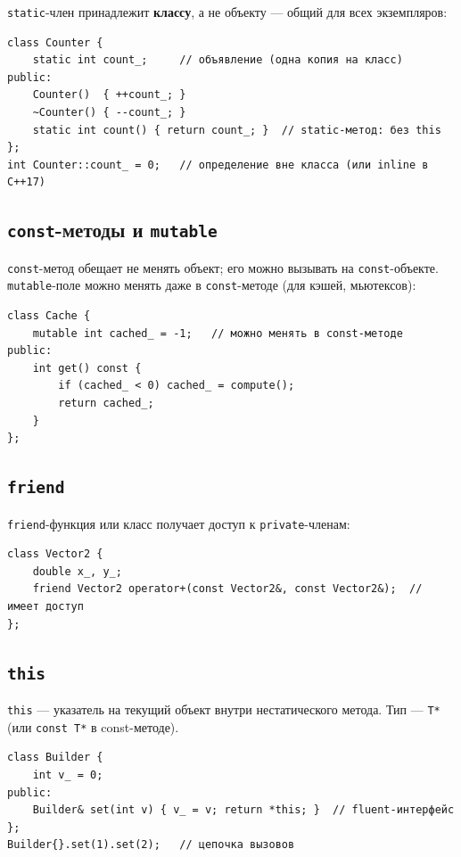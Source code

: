 \texttt{static}-член принадлежит \textbf{классу}, а не объекту --- общий для всех
экземпляров:

\begin{lstlisting}
class Counter {
    static int count_;     // объявление (одна копия на класс)
public:
    Counter()  { ++count_; }
    ~Counter() { --count_; }
    static int count() { return count_; }  // static-метод: без this
};
int Counter::count_ = 0;   // определение вне класса (или inline в C++17)
\end{lstlisting}

\subsection{\texttt{const}-методы и \texttt{mutable}}

\texttt{const}-метод обещает не менять объект; его можно вызывать на
\texttt{const}-объекте. \texttt{mutable}-поле можно менять даже в
\texttt{const}-методе (для кэшей, мьютексов):

\begin{lstlisting}
class Cache {
    mutable int cached_ = -1;   // можно менять в const-методе
public:
    int get() const {
        if (cached_ < 0) cached_ = compute();
        return cached_;
    }
};
\end{lstlisting}

\subsection{\texttt{friend}}

\texttt{friend}-функция или класс получает доступ к \texttt{private}-членам:

\begin{lstlisting}
class Vector2 {
    double x_, y_;
    friend Vector2 operator+(const Vector2&, const Vector2&);  // имеет доступ
};
\end{lstlisting}

\subsection{\texttt{this}}

\texttt{this} --- указатель на текущий объект внутри нестатического метода. Тип
--- \texttt{T*} (или \texttt{const T*} в const-методе).

\begin{lstlisting}
class Builder {
    int v_ = 0;
public:
    Builder& set(int v) { v_ = v; return *this; }  // fluent-интерфейс
};
Builder{}.set(1).set(2);   // цепочка вызовов
\end{lstlisting}


